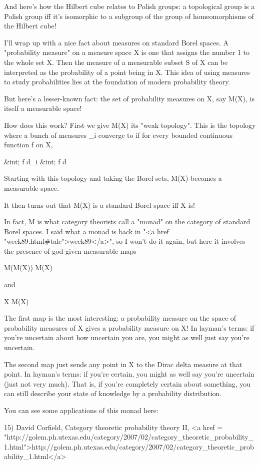 And here's how the Hilbert cube relates to Polish groups: a 
topological group is a Polish group iff it's isomorphic to a
subgroup of the group of homeomorphisms of the Hilbert cube!

I'll wrap up with a nice fact about measures on standard Borel 
spaces.  A "probability measure" on a measure space X is one that
assigns the number 1 to the whole set X.  Then the measure of a
measurable subset S of X can be interpreted as the probability
of a point being in X.  This idea of using measures to study
probabilities lies at the foundation of modern probability theory.

But here's a lesser-known fact: the set of probability measures on X,
say M(X), is itself a measurable space!

How does this work?  First we give M(X) its "weak topology".
This is the topology where a bunch of measures \mu _{i} converge to
\mu  if for every bounded continuous function f on X, 

&int; f d\mu _{i} \to  &int; f d\mu 

Starting with this topology and taking the Borel sets, M(X)
becomes a measurable space.

It then turns out that M(X) is a standard Borel space iff X is!

In fact, M is what category theorists call a "monad" on the category
of standard Borel spaces.  I said what a monad is back in "<a href =
"week89.html#tale">week89</a>", so I won't do it again, but here it
involves the presence of god-given measurable maps

M(M(X)) \to  M(X)  

and 

X \to  M(X)

The first map is the most interesting: a probability measure
on the space of probability measures of X gives a probability
measure on X!  In layman's terms: if you're uncertain about
how uncertain you are, you might as well just say you're uncertain.

The second map just sends any point in X to the Dirac delta measure at
that point.  In layman's terms: if you're certain, you might as well
say you're uncertain (just not very much).  That is, if you're
completely certain about something, you can still describe your state
of knowledge by a probability distribution.

You can see some applications of this monad here:

15) David Corfield, Category theoretic probability theory II,
<a href = "http://golem.ph.utexas.edu/category/2007/02/category_theoretic_probability_1.html">http://golem.ph.utexas.edu/category/2007/02/category_theoretic_probability_1.html</a>

